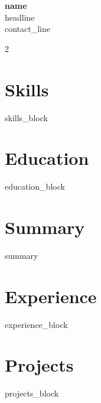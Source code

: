 \documentclass[11pt,a4paper]{article}
\begin{document}
\begin{center}
  {\Huge\bfseries\color{primary} {{name}}}\\[4pt]
  {\large\color{accent} {{headline}}}\\[6pt]
  {\small {{contact_line}}}
\end{center}
\vspace{6pt}

\begin{paracol}{2}
\section*{Skills}
{{skills_block}}

\section*{Education}
{{education_block}}

\switchcolumn
\section*{Summary}
{{summary}}

\section*{Experience}
{{experience_block}}

\section*{Projects}
{{projects_block}}

\end{paracol}
\end{document}
